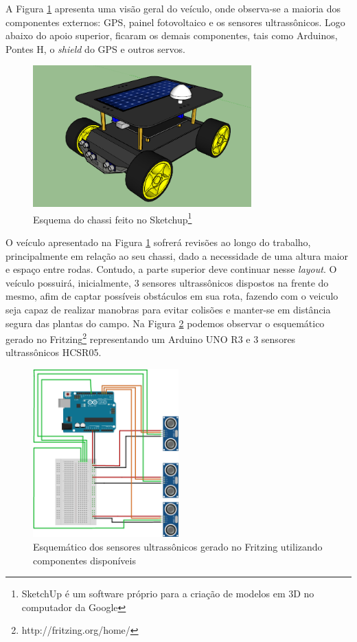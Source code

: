 A Figura \ref{fig:sketchup:vaa} apresenta uma visão geral do veículo, onde observa-se a maioria dos componentes externos: GPS, painel fotovoltaico e os sensores ultrassônicos. Logo abaixo do apoio superior, ficaram os demais componentes, tais como Arduinos, Pontes H, o \textit{shield} do GPS e outros servos. 
\begin{figure}[H]
    \centering
    \includegraphics[width=0.75\textwidth]{figuras/chassi_vaa_completo.png}
    \caption{Esquema do chassi feito no Sketchup\footnote{SketchUp é um software próprio para a criação de modelos em 3D no computador da Google}}
    \label{fig:sketchup:vaa}
\end{figure}
O veículo apresentado na Figura \ref{fig:sketchup:vaa} sofrerá revisões ao longo do trabalho, principalmente em relação ao seu chassi, dado a necessidade de uma altura maior e espaço entre rodas. Contudo, a parte superior deve continuar nesse \textit{layout}.
O veículo possuirá, inicialmente, 3 sensores ultrassônicos dispostos na frente do mesmo, afim de captar possíveis obstáculos em sua rota, fazendo com o veiculo seja capaz de realizar manobras para evitar colisões e manter-se em distância segura das plantas do campo. Na Figura \ref{fig:ultrasonico:vaa} podemos observar o esquemático gerado no Fritzing\footnote{http://fritzing.org/home/} representando um Arduino UNO R3 e 3 sensores ultrassônicos HCSR05.
\begin{figure}[H]
    \centering
    \includegraphics[width=0.5\textwidth]{figuras/ULTRASSONICO.png}
    \caption{Esquemático dos sensores ultrassônicos gerado no Fritzing utilizando componentes disponíveis}
    \label{fig:ultrasonico:vaa}
\end{figure}

